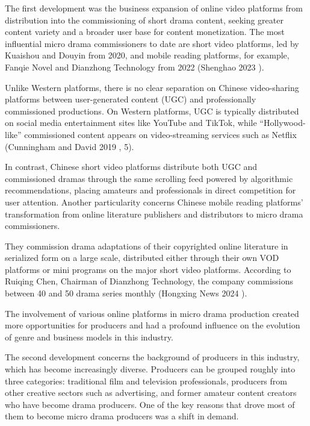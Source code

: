 \documentclass[10pt,a4paper]{article}
\begin{document}
The first development was the business expansion of online video platforms from distribution into the commissioning of short drama content, seeking greater content variety and a broader user base for content monetization. The most influential micro drama commissioners to date are short video platforms, led by Kuaishou and Douyin from 2020, and mobile reading platforms, for example, Fanqie Novel and Dianzhong Technology from 2022 (Shenghao 2023 ).\par
Unlike Western platforms, there is no clear separation on Chinese video-sharing platforms between user-generated content (UGC) and professionally commissioned productions. On Western platforms, UGC is typically distributed on social media entertainment sites like YouTube and TikTok, while “Hollywood-like” commissioned content appears on video-streaming services such as Netflix (Cunningham and David 2019 , 5).\par
In contrast, Chinese short video platforms distribute both UGC and commissioned dramas through the same scrolling feed powered by algorithmic recommendations, placing amateurs and professionals in direct competition for user attention. Another particularity concerns Chinese mobile reading platforms’ transformation from online literature publishers and distributors to micro drama commissioners.\par
They commission drama adaptations of their copyrighted online literature in serialized form on a large scale, distributed either through their own VOD platforms or mini programs on the major short video platforms. According to Ruiqing Chen, Chairman of Dianzhong Technology, the company commissions between 40 and 50 drama series monthly (Hongxing News 2024 ).\par
The involvement of various online platforms in micro drama production created more opportunities for producers and had a profound influence on the evolution of genre and business models in this industry.\par
The second development concerns the background of producers in this industry, which has become increasingly diverse. Producers can be grouped roughly into three categories: traditional film and television professionals, producers from other creative sectors such as advertising, and former amateur content creators who have become drama producers. One of the key reasons that drove most of them to become micro drama producers was a shift in demand.\par
\end{document}

